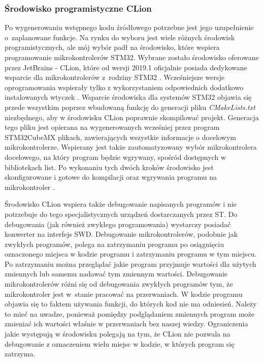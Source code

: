 \subsubsection{Środowisko programistyczne CLion}
Po wygenerowaniu wstępnego kodu źródłowego potrzebne jest jego uzupełnienie o~zaplanowane funkcje. Na rynku do wyboru jest wiele różnych środowisk programistycznych, ale mój wybór padł na środowisko, które wspiera programowanie mikrokontrolerów STM32. Wybrane zostało środowisko oferowane przez JetBrains - CLion, które od wersji 2019.1 oficjalnie posiada dedykowane wsparcie dla mikrokontrolerów z~rodziny STM32 \cite{b_site_CLion_STM_support}. Wcześniejsze wersje oprogramowania wspierały tylko z wykorzystaniem odpowiednich dodatkowo instalowanych wtyczek \cite{b_site_CLion_STM_support_v2}. %
Wsparcie środowiska dla systemów STM32 objawia się przede wszystkim poprzez wbudowaną funkcję do generacji pliku \textit{CMakeLists.txt} niezbędnego, aby w środowisku CLion poprawnie skompilować projekt. Generacja tego pliku jest opierana na wygenerowanych wcześniej przez program STM32CubeMX plikach, zawierających wszystkie informacje o docelowym mikrokontrolerze.
Wspierany jest także zautomatyzowany wybór mikrokontrolera docelowego, na który program będzie wgrywany, spośród dostępnych w bibliotekach list. Po wykonaniu tych dwóch kroków środowisko jest skonfigurowane i gotowe do kompilacji oraz wgrywania programu na mikrokontroler \cite{b_site_CLion_STM_support}.

Środowisko CLion wspiera także debugowanie napisanych programów i nie potrzebuje do tego specjalistycznych urządzeń dostarczanych przez ST. Do debugowania (jak również zwykłego programowania) wystarczy posiadać konwerter na interfejs SWD. Debugowanie mikrokontrolerów, podobnie jak zwykłych programów, polega na zatrzymaniu programu po osiągnięciu oznaczonego miejsca w kodzie programu i zatrzymaniu programu w tym miejscu. Po zatrzymaniu można przeglądać jakie program przyjmuje wartości dla użytych zmiennych lub samemu nadawać tym zmiennym wartości. Debugowanie mikrokontrolerów różni się od debugowania zwykłych programów tym, że mikrokontroler jest w~stanie pracować na przerwaniach. W kodzie programu objawia się to faktem używania funkcji, do których kod nie ma odniesień. Należy to mieć na uwadze, ponieważ pomiędzy podglądaniem zmiennych program może zmieniać ich wartości właśnie w przerwaniach bez naszej wiedzy. 
Ograniczenia jakie występują w środowisku polegają na tym, że CLion nie pozwala na debugowanie z oznaczeniem wielu miejsc w kodzie, w których program się zatrzyma.

